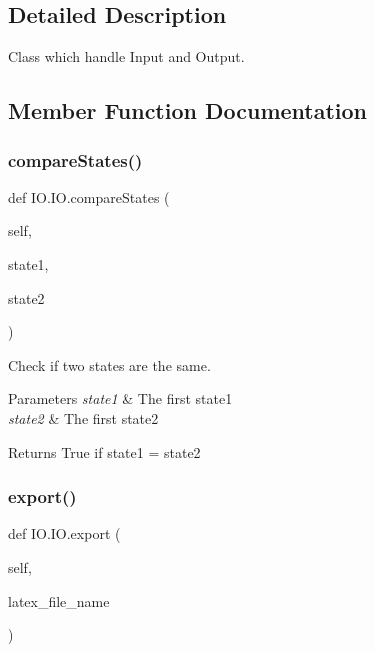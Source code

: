 \subsection{Detailed Description}
Class which handle Input and Output. 

\subsection{Member Function Documentation}
\mbox{\label{classIO_1_1IO_a1a894bd977cbe82c91a6291b1312e755}} 
\subsubsection{\texorpdfstring{compareStates()}{compareStates()}}
{\footnotesize\ttfamily def I\+O.\+I\+O.\+compare\+States (\begin{DoxyParamCaption}\item[{}]{self,  }\item[{}]{state1,  }\item[{}]{state2 }\end{DoxyParamCaption})}



Check if two states are the same. 


\begin{DoxyParams}{Parameters}
{\em state1} & The first state1 \\
\hline
{\em state2} & The first state2 \\
\hline
\end{DoxyParams}
\begin{DoxyReturn}{Returns}
True if state1 = state2 
\end{DoxyReturn}
\mbox{\label{classIO_1_1IO_a853df2a0f17524cce2b325ad5d865158}} 
\subsubsection{\texorpdfstring{export()}{export()}}
{\footnotesize\ttfamily def I\+O.\+I\+O.\+export (\begin{DoxyParamCaption}\item[{}]{self,  }\item[{}]{latex\+\_\+file\+\_\+name }\end{DoxyParamCaption})}

